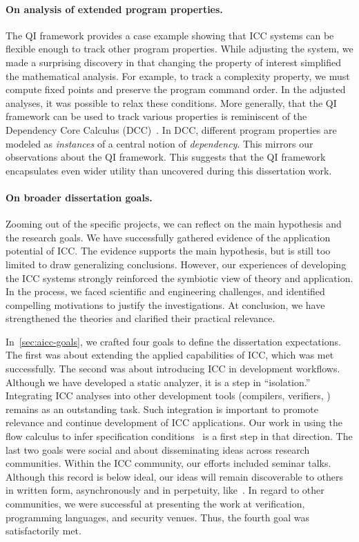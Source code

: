 \paragraph*{On analysis of extended program properties.}
The QI framework provides a case example showing that ICC systems can be flexible enough to track other program properties.
While adjusting the system, we made a surprising discovery in that changing the property of interest simplified the mathematical analysis.
For example, to track a complexity property, we must compute fixed points and preserve the program command order.
In the adjusted analyses, it was possible to relax these conditions.
More generally, that the QI framework can be used to track various properties is reminiscent of the Dependency Core Calculus (DCC)~\cite{abadi1999b}.
In DCC, different program properties are modeled as \emph{instances} of a central notion of \emph{dependency}.
This mirrors our observations about the QI framework.
This suggests that the QI framework encapsulates even wider utility than uncovered during this dissertation work.

\paragraph*{On broader dissertation goals.}
Zooming out of the specific projects, we can reflect on the main hypothesis and the research goals.
We have successfully gathered evidence of the application potential of ICC.
The evidence supports the main hypothesis, but is still too limited to draw generalizing conclusions.
However, our experiences of developing the ICC systems strongly reinforced the symbiotic view of theory and application.
In the process, we faced scientific and engineering challenges, and identified compelling motivations to justify the investigations.
At conclusion, we have strengthened the theories and clarified their practical relevance.

In~\autoref{sec:aicc-goals}, we crafted four goals to define the dissertation expectations.
The first was about extending the applied capabilities of ICC, which was met successfully.
The second was about introducing ICC in development workflows.
Although we have developed a static analyzer, it is a step in \enquote{isolation.}
Integrating ICC analyses into other development tools (compilers, verifiers, \etc) remains as an outstanding task.
Such integration is important to promote relevance and continue development of ICC {applications}.
Our work in using the flow calculus to infer specification conditions~\cite{rusch2025} is a first step in that direction.
The last two goals were social and about disseminating ideas across research communities.
Within the ICC community, our efforts included seminar talks.
Although this record is below ideal, our ideas will remain discoverable to others in written form, asynchronously and in perpetuity, like~\cite{moyen2017}.
In regard to other communities, we were successful at presenting the work at verification, programming languages, and security venues.
Thus, the fourth goal was satisfactorily met.

